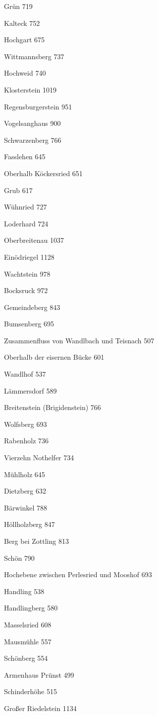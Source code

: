 Grün    719

Kalteck 752

Hochgart    675

Wittmannsberg   737

Hochweid    740

Klosterstein    1019

Regensburgerstein   951

Vogelsanghaus   900

Schwarzenberg   766

Fasslehen   645

Oberhalb Köckersried    651

Grub    617

Wühnried    727

Loderhard   724

Oberbreitenau   1037

Einödriegel 1128

Wachtstein  978

Bocksruck   972

Gemeindeberg    843

Bumsenberg  695

Zusammenfluss von Wandlbach und Teisnach    507

Oberhalb der eisernen Bücke 601

Wandlhof    537

Lämmersdorf 589

Breitenstein (Brigidenstein)    766

Wolfsberg   693

Rabenholz   736

Vierzehn Nothelfer  734

Mühlholz    645

Dietzberg   632

Bärwinkel   788

Höllholzberg    847

Berg bei Zottling   813

Schön   790

Hochebene zwischen Perlesried und Mooshof   693

Handling    538

Handlingberg    580

Masselsried 608

Mausmühle   557

Schönberg   554

Armenhaus Prünst    499

Schinderhöhe    515

Großer Riedelstein  1134

